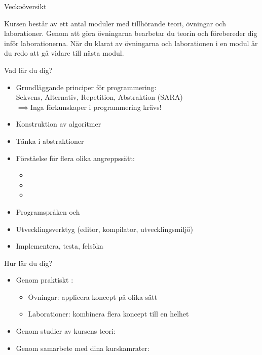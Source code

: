 


\begin{Slide}{Veckoöversikt}
\noindent\resizebox{0.9\columnwidth}{!}{

}
\end{Slide}

\ifkompendium
\noindent Kursen består av ett antal moduler med tillhörande teori, övningar och laborationer. Genom att göra övningarna bearbetar du teorin och förebereder dig inför laborationerna. När du klarat av  övningarna och laborationen i en modul är du redo att gå vidare till nästa modul.  
\fi

\begin{Slide}{Vad lär du dig?}
\begin{itemize}
\item Grundläggande principer för programmering:\\ Sekvens, Alternativ, Repetition, Abstraktion (SARA)\\$\implies$Inga förkunskaper i programmering krävs!
\item Konstruktion av algoritmer
\item Tänka i abstraktioner
\item Förståelse för flera olika angreppssätt: 
\begin{itemize}
\item {}%
\item {}%
\item {}%
\end{itemize}
\item Programspråken  och 
\item Utvecklingsverktyg (editor, kompilator, utvecklingsmiljö)
\item Implementera, testa, felsöka
\end{itemize}
\end{Slide}

\begin{Slide}{Hur lär du dig?}
\begin{itemize}
\item Genom praktiskt : 
\begin{itemize}
\item Övningar: applicera koncept på olika sätt
\item Laborationer: kombinera flera koncept till en helhet
\end{itemize}
\item Genom studier av kursens teori: 
\item Genom samarbete med dina kurskamrater: 
\end{itemize}
\end{Slide}


